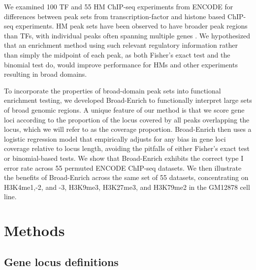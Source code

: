 We examined 100 TF and 55 HM ChIP-seq experiments from ENCODE \cite{ENCODEProjectConsortium:2012gc} for differences between peak sets from transcription-factor and histone based ChIP-seq experiments. HM peak sets have been observed to have broader peak regions than TFs, with individual peaks often spanning multiple genes \cite{Zang:2009ht}. We hypothesized that an enrichment method using such relevant regulatory information rather than simply the midpoint of each peak, as both Fisher's exact test and the binomial test do, would improve performance for HMs and other experiments resulting in broad domains.

To incorporate the properties of broad-domain peak sets into functional enrichment testing, we developed Broad-Enrich to functionally interpret large sets of broad genomic regions. A unique feature of our method is that we score gene loci according to the proportion of the locus covered by all peaks overlapping the locus, which we will refer to as the coverage proportion. Broad-Enrich then uses a logistic regression model that empirically adjusts for any bias in gene loci coverage relative to locus length, avoiding the pitfalls of either Fisher's exact test or binomial-based tests. We show that Broad-Enrich exhibits the correct type I error rate across 55 permuted ENCODE ChIP-seq datasets. We then illustrate the benefits of Broad-Enrich across the same set of 55 datasets, concentrating on H3K4me1,-2, and -3, H3K9me3, H3K27me3, and H3K79me2 in the GM12878 cell line.

\section{Methods}
\label{broadenrich_methods}

\subsection{Gene locus definitions}
\label{broadenrich_methods_locus}

